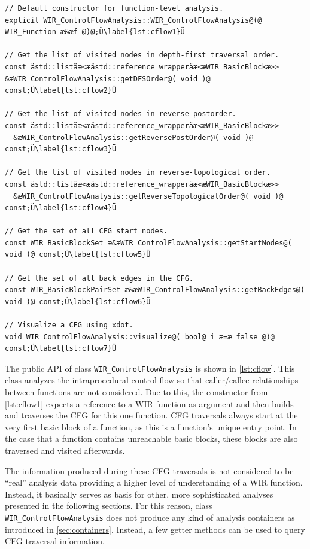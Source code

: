 \begin{lstlisting}[style=code,float=!b,caption={Public Interface of Class \texttt{WIR\_ControlFlowAnalysis}},label=lst:cflow]
// Default constructor for function-level analysis.
explicit WIR_ControlFlowAnalysis::WIR_ControlFlowAnalysis@(@ WIR_Function æ&æf @)@;Ü\label{lst:cflow1}Ü

// Get the list of visited nodes in depth-first traversal order.
const ästd::listäæ<æästd::reference_wrapperäæ<æWIR_BasicBlockæ>> &æWIR_ControlFlowAnalysis::getDFSOrder@( void )@ const;Ü\label{lst:cflow2}Ü

// Get the list of visited nodes in reverse postorder.
const ästd::listäæ<æästd::reference_wrapperäæ<æWIR_BasicBlockæ>>
  &æWIR_ControlFlowAnalysis::getReversePostOrder@( void )@ const;Ü\label{lst:cflow3}Ü

// Get the list of visited nodes in reverse-topological order.
const ästd::listäæ<æästd::reference_wrapperäæ<æWIR_BasicBlockæ>>
  &æWIR_ControlFlowAnalysis::getReverseTopologicalOrder@( void )@ const;Ü\label{lst:cflow4}Ü

// Get the set of all CFG start nodes.
const WIR_BasicBlockSet æ&æWIR_ControlFlowAnalysis::getStartNodes@( void )@ const;Ü\label{lst:cflow5}Ü

// Get the set of all back edges in the CFG.
const WIR_BasicBlockPairSet æ&æWIR_ControlFlowAnalysis::getBackEdges@( void )@ const;Ü\label{lst:cflow6}Ü

// Visualize a CFG using xdot.
void WIR_ControlFlowAnalysis::visualize@( bool@ i æ=æ false @)@ const;Ü\label{lst:cflow7}Ü
\end{lstlisting}

The public \gls{API} of class \texttt{WIR\_ControlFlowAnalysis} is shown in \cref{lst:cflow}.
This class analyzes the intraprocedural control flow so that caller/callee relationships between functions are not considered.
Due to this, the constructor from \cref{lst:cflow1} expects a reference to a \gls{WIR} function as argument and then builds and traverses the \gls{CFG} for this one function.
\gls{CFG} traversals always start at the very first basic block of a function, as this is a function's unique entry point.
In the case that a function contains unreachable basic blocks, these blocks are also traversed and visited afterwards.

The information produced during these \gls{CFG} traversals is not considered to be ``real'' analysis data providing a higher level of understanding of a \gls{WIR} function.
Instead, it basically serves as basis for other, more sophisticated analyses presented in the following sections.
For this reason, class \texttt{WIR\_ControlFlowAnalysis} does not produce any kind of analysis containers as introduced in \cref{sec:containers}.
Instead, a few getter methods can be used to query \gls{CFG} traversal information.


